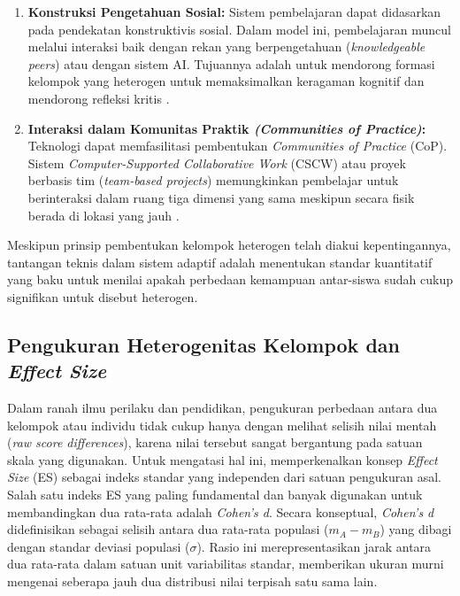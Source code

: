 \begin{enumerate}
    \item \textbf{Konstruksi Pengetahuan Sosial:} Sistem pembelajaran dapat didasarkan
    pada pendekatan konstruktivis sosial. Dalam model ini, pembelajaran muncul melalui
    interaksi baik dengan rekan yang berpengetahuan (\textit{knowledgeable peers})
    atau dengan sistem AI. Tujuannya adalah untuk mendorong formasi kelompok yang
    heterogen untuk memaksimalkan keragaman kognitif dan mendorong refleksi kritis
    \autocite{Halkiopoulos2024}.

    \item \textbf{Interaksi dalam Komunitas Praktik \textit{(Communities of Practice)}:
    } Teknologi dapat memfasilitasi pembentukan \textit{Communities of Practice} (CoP).
    Sistem \textit{Computer-Supported Collaborative Work} (CSCW) atau proyek berbasis
    tim (\textit{team-based projects}) memungkinkan pembelajar untuk berinteraksi
    dalam ruang tiga dimensi yang sama meskipun secara fisik berada di lokasi yang
    jauh \autocite{Ryoo2021}.
\end{enumerate}

Meskipun prinsip pembentukan kelompok heterogen telah diakui kepentingannya,
tantangan teknis dalam sistem adaptif adalah menentukan standar kuantitatif yang
baku untuk menilai apakah perbedaan kemampuan antar-siswa sudah cukup signifikan
untuk disebut heterogen.

\subsection{Pengukuran Heterogenitas Kelompok dan \textit{Effect Size}}

Dalam ranah ilmu perilaku dan pendidikan, pengukuran perbedaan antara dua kelompok
atau individu tidak cukup hanya dengan melihat selisih nilai mentah (\textit{raw
score differences}), karena nilai tersebut sangat bergantung pada satuan skala
yang digunakan. Untuk mengatasi hal ini, \textcite{Cohen1988} memperkenalkan
konsep \textit{Effect Size} (ES) sebagai indeks standar yang independen dari
satuan pengukuran asal. Salah satu indeks ES yang paling fundamental dan banyak
digunakan untuk membandingkan dua rata-rata adalah \textit{Cohen's d}. Secara
konseptual, \textit{Cohen's d} didefinisikan sebagai selisih antara dua rata-rata
populasi ($m_A - m_B$) yang dibagi dengan standar deviasi populasi ($\sigma$).
Rasio ini merepresentasikan jarak antara dua rata-rata dalam satuan unit
variabilitas standar, memberikan ukuran murni mengenai seberapa jauh dua
distribusi nilai terpisah satu sama lain.

